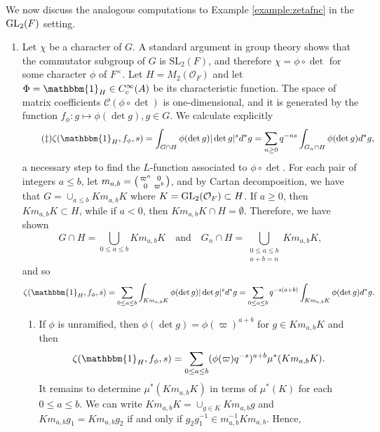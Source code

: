 \begin{example}\label{example:zetafncgl2}
    We now discuss the analogous computations to Example \ref{example:zetafnc} in the $\mathrm{GL}_2(F)$ setting. 
    \begin{enumerate}[(1)]
        \item Let $\chi$ be a character of $G$. A standard argument in group theory shows that the commutator subgroup of $G$ is $\mathrm{SL}_2(F)$, and therefore $\chi=\phi\circ\det$ for some character $\phi$ of $F^\times$. Let $H=M_2(\mathcal{O}_F)$ and let $\Phi=\mathbbm{1}_H\in C_c^\infty(A)$ be its characteristic function. The space of matrix coefficients $\mathcal{C}(\phi\circ\det)$ is one-dimensional, and it is generated by the function $f_\phi:g\mapsto\phi(\det g),g\in G$. We calculate explicitly 
        \begin{equation}\tag{\ddag}\label{eqn:zetagl2}
            \zeta(\mathbbm{1}_H,f_\phi,s)=\int_{G\cap H}\phi(\det g)|\det g|^sd^*g=\sum_{n\geq 0}q^{-ns}\int_{G_n\cap H}\phi(\det g)d^*g,
        \end{equation}
        a necessary step to find the $L$-function associated to $\phi\circ\det$. For each pair of integers $a\leq b$, let $m_{a,b}=\begin{psmallmatrix}
            \varpi^a & 0\\
            0 & \varpi^b\\
        \end{psmallmatrix}$, and by Cartan decomposition, we have that $G=\cup_{a\leq b}K m_{a,b}K$ where $K=\mathrm{GL}_2(\mathcal{O}_F)\subset H$. If $a\geq 0$, then $Km_{a,b}K\subset H$, while if $a<0$, then $Km_{a,b}K\cap H=\emptyset$. Therefore, we have shown 
        $$G\cap H=\bigcup_{0\leq a\leq b}Km_{a,b}K\quad\text{and}\quad G_n\cap H=\bigcup_{\substack{0\leq a\leq b \\ a+b=n}} Km_{a,b}K,$$ and so
        $$\zeta(\mathbbm{1}_H,f_\phi,s)=\sum_{0\leq a\leq b}\int_{Km_{a,b}K}\phi(\det g)|\det g|^sd^*g=\sum_{0\leq a\leq b}q^{-s(a+b)}\int_{Km_{a,b}K}\phi(\det g)d^*g.$$
        \begin{enumerate}
            \item If $\phi$ is unramified, then $\phi(\det g)=\phi(\varpi)^{a+b}$ for $g\in Km_{a,b}K$ and then
            $$\zeta(\mathbbm{1}_H,f_\phi,s)=\sum_{0\leq a\leq b}(\phi(\varpi)q^{-s})^{a+b}\mu^*(Km_{a,b}K).$$
            It remains to determine $\mu^*(Km_{a,b}K)$ in terms of $\mu^*(K)$ for each $0\leq a\leq b$. We can write 
            $Km_{a,b}K=\cup_{g\in K}Km_{a,b}g$
            and $Km_{a,b}g_1=Km_{a,b}g_2$ if and only if $g_2g_1^{-1}\in m_{a,b}^{-1}K m_{a,b}$. Hence,

\end{enumerate}
\end{enumerate}
\end{example}
